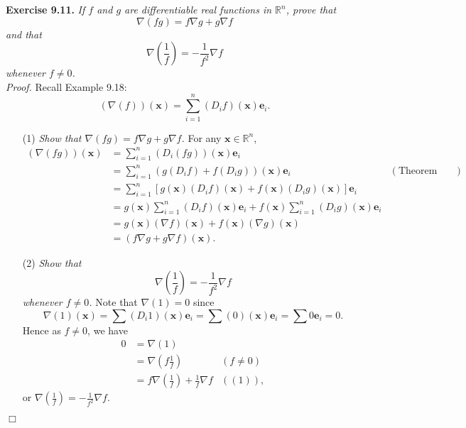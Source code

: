 \documentclass{article}
\begin{document}



\textbf{Exercise 9.11.}
\emph{If $f$ and $g$ are differentiable real functions in $\mathbb{R}^n$,
prove that
\[
  \nabla(fg) = f \nabla g + g \nabla f
\]
and that
\[
  \nabla\left(\frac{1}{f}\right) = -\frac{1}{f^2} \nabla f
\]
whenever $f \neq 0$.} \\

\emph{Proof.}
Recall Example 9.18:
\[
  (\nabla(f))(\mathbf{x}) = \sum_{i=1}^{n}(D_i f)(\mathbf{x})\mathbf{e}_i.
\]

\begin{enumerate}
\item[(1)]
  \emph{Show that $\nabla(fg) = f \nabla g + g \nabla f$.}
  For any $\mathbf{x} \in \mathbb{R}^n$,
  \begin{align*}
    (\nabla(fg))(\mathbf{x})
    &= \sum_{i=1}^{n}(D_i(fg))(\mathbf{x})\mathbf{e}_i \\
    &= \sum_{i=1}^{n}(g (D_i f) + f (D_i g))(\mathbf{x})\mathbf{e}_i
      &(\text{Theorem 5.3(b)}) \\
    &= \sum_{i=1}^{n} \left[ g(\mathbf{x}) (D_i f)(\mathbf{x})
      + f(\mathbf{x}) (D_i g)(\mathbf{x}) \right]\mathbf{e}_i \\
    &= g(\mathbf{x}) \sum_{i=1}^{n} (D_i f)(\mathbf{x})\mathbf{e}_i
      + f(\mathbf{x}) \sum_{i=1}^{n} (D_i g)(\mathbf{x})\mathbf{e}_i \\
    &= g(\mathbf{x}) (\nabla f)(\mathbf{x})
      + f(\mathbf{x}) (\nabla g)(\mathbf{x}) \\
    &= (f \nabla g + g \nabla f)(\mathbf{x}).
  \end{align*}

\item[(2)]
  \emph{Show that $$\nabla\left(\frac{1}{f}\right) = -\frac{1}{f^2} \nabla f$$
  whenever $f \neq 0$.}
  Note that $\nabla(1) = 0$
  since
  \[
    \nabla(1)(\mathbf{x})
    = \sum (D_i 1)(\mathbf{x})\mathbf{e}_i
    = \sum (0)(\mathbf{x})\mathbf{e}_i
    = \sum 0 \mathbf{e}_i
    = 0.
  \]
  Hence as $f \neq 0$, we have
  \begin{align*}
    0
    &= \nabla(1) \\
    &= \nabla\left(f \frac{1}{f}\right)
      & (f \neq 0) \\
    &= f \nabla\left(\frac{1}{f}\right) + \frac{1}{f} \nabla f
      & ((1)),
  \end{align*}
  or $\nabla\left(\frac{1}{f}\right) = -\frac{1}{f^2} \nabla f$.
\end{enumerate}
$\Box$ \\\\
\end{document}

